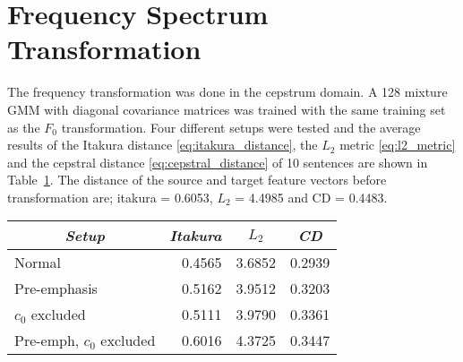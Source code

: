 \section{Frequency Spectrum Transformation} %
\label{sec:frequency_transformation}
The frequency transformation was done in the cepstrum domain. A 128 mixture GMM with diagonal covariance matrices was trained with the same training set as the $F_0$ transformation. Four different setups were tested and the average results of the Itakura distance \eqref{eq:itakura_distance}, the $L_2$ metric \eqref{eq:l2_metric} and the cepstral distance \eqref{eq:cepstral_distance} of 10 sentences are shown in Table~\ref{tab:absolute_results}. The distance of the source and target feature vectors before transformation are; itakura = 0.6053, $L_2$ = 4.4985 and CD = 0.4483.
\begin{table}[htbp]
	\begin{center}
		\label{tab:absolute_results}
		\begin{tabular}{lrrr}
			\toprule
			\multicolumn{1}{c}{\emph{Setup}} & \multicolumn{1}{c}{\emph{Itakura}} & \multicolumn{1}{c}{\emph{$L_2$}} & \multicolumn{1}{c}{\emph{CD}}\\
			\midrule
			Normal &  0.4565 & 3.6852 & 0.2939 \\
			Pre-emphasis & 0.5162 & 3.9512 & 0.3203 \\
			$c_0$ excluded & 0.5111 & 3.9790 & 0.3361 \\
			Pre-emph, $c_0$ excluded & 0.6016 & 4.3725 & 0.3447 \\
			\bottomrule			
		\end{tabular}		
	\end{center}	
\end{table}



